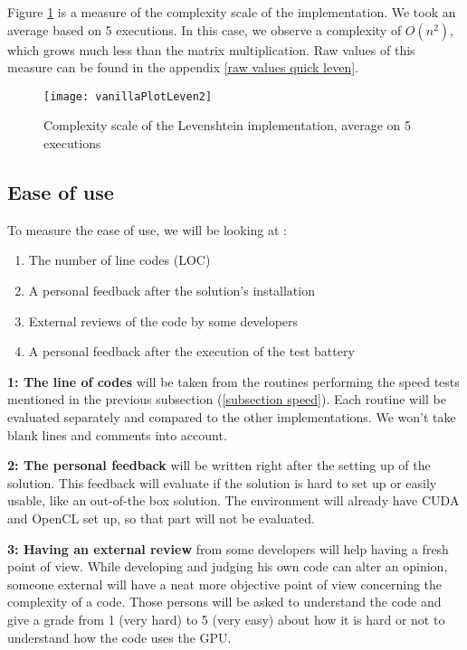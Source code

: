 Figure \ref{fig plot leven} is a measure of the complexity scale of the implementation. We took an average based on 5 executions. In this case, we observe a complexity of $O(n^2)$, which grows much less than the matrix multiplication. Raw values of this measure can be found in the appendix \ref{raw values quick leven}.

\begin{figure}[h!]
\centering
\texttt{[image: vanillaPlotLeven2]}
\caption{Complexity scale of the Levenshtein implementation, average on 5 executions}
\label{fig plot leven}
\end{figure}

\subsection{Ease of use}

To measure the ease of use, we will be looking at :

\begin{enumerate}
  \item The number of line codes (LOC)
  \item A personal feedback after the solution's installation
  \item External reviews of the code by some developers
  \item A personal feedback after the execution of the test battery
\end{enumerate}

\textbf{1: The line of codes} will be taken from the routines performing the speed tests mentioned in the previous subsection (\ref{subsection speed}). Each routine will be evaluated separately and compared to the other implementations. We won't take blank lines and comments into account.

\textbf{2: The personal feedback} will be written right after the setting up of the solution. This feedback will evaluate if the solution is hard to set up or easily usable, like an out-of-the box solution. The environment will already have CUDA and OpenCL set up, so that part will not be evaluated.

\textbf{3: Having an external review} from some developers will help having a fresh point of view. While developing and judging his own code can alter an opinion, someone external will have a neat more objective point of view concerning the complexity of a code. Those persons will be asked to understand the code and give a grade from 1 (very hard) to 5 (very easy) about how it is hard or not to understand how the code uses the GPU.

